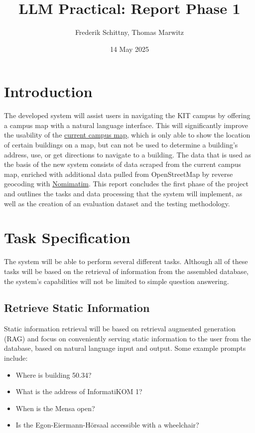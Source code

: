 \documentclass{article}
\title{LLM Practical: Report Phase 1}
\author{Frederik Schittny, Thomas Marwitz}
\date{14 May 2025}
\begin{document}
\maketitle

\section{Introduction}
The developed system will assist users in navigating the KIT campus by offering a campus map with a natural language interface. This will significantly improve the usability of the \href{https://www.kit.edu/campusplan/index_en.php}{current campus map}, which is only able to show the location of certain buildings on a map, but can not be used to determine a building's address, use, or get directions to navigate to a building. The data that is used as the basis of the new system consists of data scraped from the current campus map, enriched with additional data pulled from OpenStreetMap by reverse geocoding with \href{https://nominatim.org/release-docs/latest/api/Reverse/}{Nomimatim}. This report concludes the first phase of the project and outlines the tasks and data processing that the system will implement, as well as the creation of an evaluation dataset and the testing methodology.

\section{Task Specification} \label{sec:tasks}
The system will be able to perform several different tasks. Although all of these tasks will be based on the retrieval of information from the assembled database, the system's capabilities will not be limited to simple question answering.

\subsection{Retrieve Static Information} \label{sec:stat_info}
Static information retrieval will be based on retrieval augmented generation (RAG) and focus on conveniently serving static information to the user from the database, based on natural language input and output. Some example prompts include:
  \begin{itemize}
      \item Where is building 50.34?
      \item What is the address of InformatiKOM 1?
      \item When is the Mensa open?
      \item Is the Egon-Eiermann-Hörsaal accessible with a wheelchair?
  \end{itemize}
\end{document}
